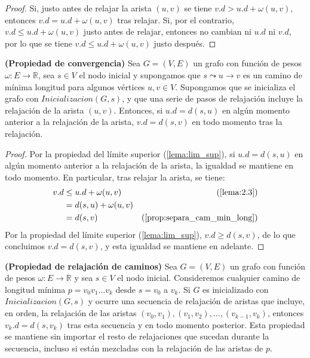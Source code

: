 \begin{proof}
	Si, justo antes de relajar la arista $(u,v)$ se tiene $v.d > u.d + \omega(u,v)$, entonces $v.d = u.d + \omega(u,v)$ tras relajar. Si, por el contrario, $v.d\leq u.d + \omega(u,v)$ justo antes de relajar, entonces no cambian ni $u.d$ ni $v.d$, por lo que se tiene $v.d\leq u.d + \omega(u,v)$ justo después.
\end{proof}

\begin{lema}\label{lema:convergencia}
	\textbf{(Propiedad de convergencia)} Sea $G=(V,E)$ un grafo con función de pesos $\omega : E\rightarrow \mathbb{R}$, sea $s\in V$ el nodo inicial y supongamos que $s \leadsto u \rightarrow v$ es un camino de mínima longitud para algunos vértices $u,v\in V$. Supongamos que se inicializa el grafo con $Inicializacion(G,s)$, y que una serie de pasos de relajación incluye la relajación de la arista $(u,v)$. Entonces, si $u.d=d(s,u)$ en algún momento anterior a la relajación de la arista, $v.d=d(s,v)$ en todo momento tras la relajación.
\end{lema}

\begin{proof}
	Por la propiedad del límite superior (\autoref{lema:lim_sup}), si $u.d=d(s,u)$ en algún momento anterior a la relajación de la arista, la igualdad se mantiene en todo momento. En particular, tras relajar la arista, se tiene:
	\begin{align*}
			v.d & \leq u.d + \omega(u,v) & (\textrm{\autoref{lema:2.3}}) \\
			& = d(s,u) + \omega(u,v) \\
			& = d(s,v) &(\textrm{\autoref{prop:separa_cam_min_long}})
	\end{align*}
	Por la propiedad del límite superior (\autoref{lema:lim_sup}), $v.d\geq d(s,v)$, de lo que concluimos $v.d = d(s,v)$, y esta igualdad se mantiene en adelante.
\end{proof}

\begin{lema}\label{lema:relaj_caminos}
	\textbf{(Propiedad de relajación de caminos)} Sea $G=(V,E)$ un grafo con función de pesos $\omega : E\rightarrow \mathbb{R}$ y sea $s\in V$ el nodo inicial. Consideremos cualquier camino de longitud mínima $p = v_0v_1...v_k$ desde $s=v_0$ a $v_k$. Si $G$ es inicializado con $Inicializacion(G,s)$ y ocurre una secuencia de relajación de aristas que incluye, en orden, la relajación de las aristas $(v_0,v_1),(v_1,v_2),...,(v_{k-1},v_k)$, entonces $v_k.d=d(s,v_k)$ tras esta secuencia y en todo momento posterior. Esta propiedad se mantiene sin importar el resto de relajaciones que sucedan durante la secuencia, incluso si están mezcladas con la relajación de las aristas de $p$.
\end{lema}

